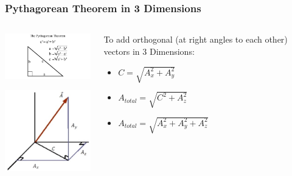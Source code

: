 \documentclass{beamer}
\begin{document}
\begin{frame}\frametitle{Pythagorean Theorem in 3 Dimensions}
\begin{columns}
\begin{column}{5cm}
\begin{center}
\includegraphics[width=5cm]{fig/pathagorean.png}

\vspace{0.25cm}

\includegraphics[width=4cm]{fig/pathag3D.jpg}

\end{center}
\end{column}
\begin{column}{5cm}
To add orthogonal (at right angles to each other) vectors in 3 Dimensions:
\begin{itemize}
\item $C = \sqrt{A_x^2 + A_y^2}$
\item $A_{total} = \sqrt{C^2 + A_z^2}$
\item $A_{total} = \sqrt{A_x^2 + A_y^2 + A_z^2}$
\end{itemize}
\end{column}
\end{columns}
\end{frame}
\end{document}

